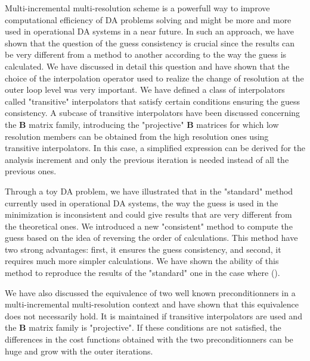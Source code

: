 \documentclass[npg, manuscript]{copernicus}
\begin{document}
\conclusions  %
Multi-incremental multi-resolution scheme is a powerfull way to improve computational efficiency of DA problems solving and might be more and more used in operational DA systems in a near future. In such an approach, we have shown that the question of the guess consistency is crucial since the results can be very different from a method to another according to the way the guess is calculated. We have discussed in detail this question and have shown that the choice of the interpolation operator used to realize the change of resolution at the outer loop level was very important. We have defined a class of interpolators called "transitive" interpolators that satisfy certain conditions ensuring the guess consistency. A subcase of transitive interpolators have been discussed concerning the $\mathbf{B}$ matrix family, introducing the "projective" $\mathbf{B}$ matrices for which low resolution members can be obtained from the high resolution ones using transitive interpolators. In this case, a simplified expression can be derived for the analysis increment and only the previous iteration is needed instead of all the previous ones.

Through a toy DA problem, we have illustrated that in the "standard" method currently used in operational DA systems, the way the guess is used in the minimization is inconsistent and could give results that are very different from the theoretical ones. We introduced a new "consistent" method to compute the guess based on the idea of reversing the order of calculations. This method have two strong advantages: first, it ensures the guess consistency, and second, it requires much more simpler calculations. We have shown the ability of this method to reproduce the results of the "standard" one in the case where ().

We have also discussed the equivalence of two well known preconditionners in a multi-incremental multi-resolution context and have shown that this equivalence does not necessarily hold. It is maintained if transitive interpolators are used and the $\mathbf{B}$ matrix family is "projective". If these conditions are not satisfied, the differences in the cost functions obtained with the two preconditionners can be huge and grow with the outer iterations. 

\end{document}
